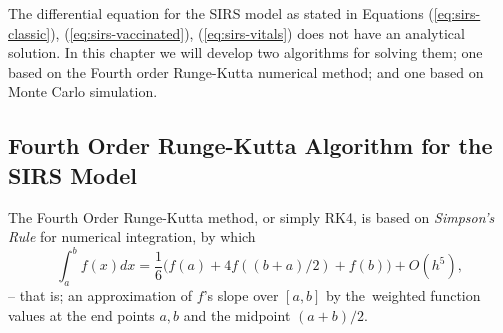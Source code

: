 \documentclass[]{article}
\begin{document}
The differential equation for the SIRS model as stated in Equations (\ref{eq:sirs-classic}), (\ref{eq:sirs-vaccinated}), (\ref{eq:sirs-vitals}) does not have an analytical solution. In this chapter we will develop two algorithms for solving them; one based on the Fourth order Runge-Kutta numerical method; and one based on Monte Carlo simulation.

\subsection{Fourth Order Runge-Kutta Algorithm for the SIRS Model} \label{sec:runge-kutta}
The Fourth Order Runge-Kutta method, or simply RK4, is based on \textit{Simpson's Rule} for numerical integration, by which
\begin{equation} \label{eq:simpsons-rule}
	\int_{a}^{b} f(x) dx = \frac{1}{6} \big( f(a) + 4f((b+a)/2) + f(b) \big) + O(h^5),
\end{equation}
-- that is; an approximation of $f$'s slope over $[a,b]$ by the weighted function values at the end points $a,b$ and the midpoint $(a+b)/2$.
\end{document}
